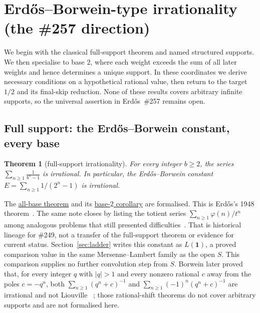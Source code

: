 \documentclass[11pt]{article}
\newcommand{\commit}{99f4bf47422abbd8757cbb22b50ba079d764d3a7}
\newcommand{\repobase}{https://github.com/wcook04/plectis-erdos/blob/\commit}
\newcommand{\PK}{Erdos249257}
\newcommand{\lword}[4]{\href{\repobase/\PK/#1\#L#2}{#4}}
\newtheorem{theorem}{Theorem}[section]
\theoremstyle{definition}
\theoremstyle{remark}
\newcommand{\ph}{\varphi}
\begin{document}
\section{Erd\H{o}s--Borwein-type irrationality (the \#257 direction)}\label{sec:eb}

We begin with the classical full-support theorem and named structured
supports.  We then specialise to base \(2\), where each weight exceeds the sum
of all later weights and hence determines a unique support.  In these
coordinates we derive necessary conditions on a hypothetical rational value,
then return to the target \(1/2\) and its final-skip reduction.  None of these
results covers arbitrary infinite supports, so the universal assertion in
Erd\H{o}s~\#257 remains open.

\subsection{Full support: the Erd\H{o}s--Borwein constant, every base}

\begin{theorem}[full-support irrationality]\label{res:full}
For every integer $b\ge2$, the series $\displaystyle\sum_{n\ge1}\frac{1}{b^n-1}$ is
irrational. In particular, the Erd\H{o}s--Borwein constant $E=\sum_{n\ge1}1/(2^n-1)$
is irrational.
\end{theorem}
\noindent The
\lword{CertificateKernel.lean}{8328}{irrational_erdosSum_full_support}{all-base theorem}
and its
\lword{CertificateKernel.lean}{8335}{irrational_erdosBorwein_series}{base-\(2\) corollary}
are formalised.  This is Erd\H{o}s's 1948 theorem~\cite[Theorem, p.~63]{erdos1948}.
The same note closes by listing the totient series
\(\sum_{n\ge1}\ph(n)/t^n\) among analogous problems that still presented
difficulties~\cite[p.~66]{erdos1948}.  That is historical lineage for
\#249, not a transfer of the full-support theorem or evidence for current status.
Section~\ref{sec:ladder} writes this constant as $L(\mathbf 1)$, a proved
comparison value in the same Mersenne--Lambert family as the open $S$.  This
comparison supplies no further convolution step from $S$.  Borwein later proved that,
for every integer $q$ with $|q|>1$ and every nonzero rational $c$ away from
the poles $c=-q^n$, both
\(\sum_{n\ge1}(q^n+c)^{-1}\) and
\(\sum_{n\ge1}(-1)^n(q^n+c)^{-1}\) are irrational and not Liouville
~\cite[Thms.~1--2, pp.~142, 145--146]{borwein1992}; those rational-shift
theorems do not cover arbitrary supports and are not formalised here.
\end{document}
